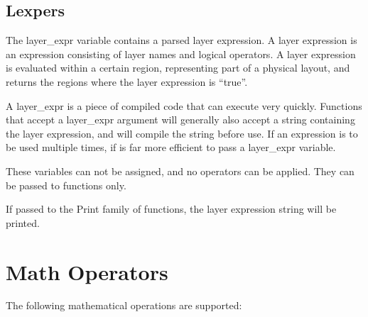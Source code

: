 \subsection{Lexpers}

The layer\_expr variable contains a parsed layer expression.  A layer
expression is an expression consisting of layer names and logical
operators.  A layer expression is evaluated within a certain region,
representing part of a physical layout, and returns the regions where
the layer expression is ``true''.

A layer\_expr is a piece of compiled code that can execute very
quickly.  Functions that accept a layer\_expr argument will generally
also accept a string containing the layer expression, and will compile
the string before use.  If an expression is to be used multiple times,
if is far more efficient to pass a layer\_expr variable.

These variables can not be assigned, and no operators can be applied. 
They can be passed to functions only.

If passed to the {\vt Print} family of functions, the layer
expression string will be printed.


\section{Math Operators}
\label{mathops}

The following mathematical operations are supported:

